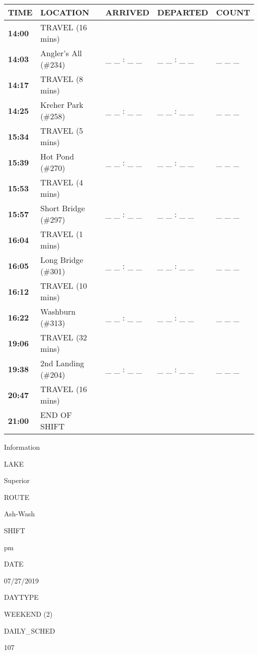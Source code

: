 \documentclass[]{article}
\begin{document}
\begin{tabular}{>{\bfseries}lllll}
\toprule
\textbf{TIME} & \textbf{LOCATION} & \textbf{ARRIVED} & \textbf{DEPARTED} & \textbf{COUNT}\\
\midrule
14:00 & TRAVEL (16 mins) &  &  & \\
14:03 & Angler's All (\#234) & \_ \_ : \_ \_ & \_ \_ : \_ \_ & \_ \_ \_\\
14:17 & TRAVEL (8 mins) &  &  & \\
14:25 & Kreher Park (\#258) & \_ \_ : \_ \_ & \_ \_ : \_ \_ & \_ \_ \_\\
15:34 & TRAVEL (5 mins) &  &  & \\
15:39 & Hot Pond (\#270) & \_ \_ : \_ \_ & \_ \_ : \_ \_ & \_ \_ \_\\
15:53 & TRAVEL (4 mins) &  &  & \\
15:57 & Short Bridge (\#297) & \_ \_ : \_ \_ & \_ \_ : \_ \_ & \_ \_ \_\\
16:04 & TRAVEL (1 mins) &  &  & \\
16:05 & Long Bridge (\#301) & \_ \_ : \_ \_ & \_ \_ : \_ \_ & \_ \_ \_\\
16:12 & TRAVEL (10 mins) &  &  & \\
16:22 & Washburn (\#313) & \_ \_ : \_ \_ & \_ \_ : \_ \_ & \_ \_ \_\\
19:06 & TRAVEL (32 mins) &  &  & \\
19:38 & 2nd Landing (\#204) & \_ \_ : \_ \_ & \_ \_ : \_ \_ & \_ \_ \_\\
20:47 & TRAVEL (16 mins) &  &  & \\
21:00 & END OF SHIFT &  &  & \\
\bottomrule
\end{tabular}\newpage

Information

LAKE

Superior

ROUTE

Ash-Wash

SHIFT

pm

DATE

07/27/2019

DAYTYPE

WEEKEND (2)

DAILY\_SCHED

107

\vspace{24pt}
\end{document}
